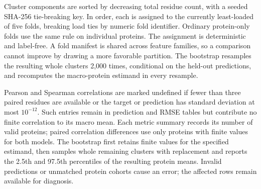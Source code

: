 Cluster components are sorted by decreasing total residue count, with a seeded SHA-256 tie-breaking key. In order, each is assigned to the currently least-loaded of five folds, breaking load ties by numeric fold identifier. Ordinary protein-only folds use the same rule on individual proteins. The assignment is deterministic and label-free. A fold manifest is shared across feature families, so a comparison cannot improve by drawing a more favorable partition. The bootstrap resamples the resulting whole clusters 2,000 times, conditional on the held-out predictions, and recomputes the macro-protein estimand in every resample.

Pearson and Spearman correlations are marked undefined if fewer than three paired residues are available or the target or prediction has standard deviation at most $10^{-12}$. Such entries remain in prediction and RMSE tables but contribute no finite correlation to its macro mean. Each metric summary records its number of valid proteins; paired correlation differences use only proteins with finite values for both models. The bootstrap first retains finite values for the specified estimand, then samples whole remaining clusters with replacement and reports the 2.5th and 97.5th percentiles of the resulting protein means. Invalid predictions or unmatched protein cohorts cause an error; the affected rows remain available for diagnosis.
